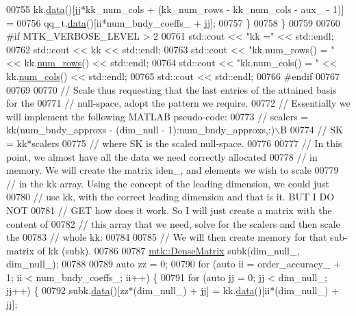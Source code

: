 \begin{DoxyCode}
{{00755       kk.\hyperlink{classmtk_1_1DenseMatrix_a0c33b8a9e01d157c61ddbdf807c25d84}{data}()[jj*kk\_num\_cols + (kk\_num\_rows - kk\_num\_cols - aux\_ - 1)] =
00756         qq\_t.\hyperlink{classmtk_1_1DenseMatrix_a0c33b8a9e01d157c61ddbdf807c25d84}{data}()[ii*num\_bndy\_coeffs\_ + jj];
00757     \}
00758   \}
00759 
00760 \textcolor{preprocessor}{  #if MTK\_VERBOSE\_LEVEL > 2}
00761   std::cout << \textcolor{stringliteral}{"kk ="} << std::endl;
00762   std::cout << kk << std::endl;
00763   std::cout << \textcolor{stringliteral}{"kk.num\_rows() = "} << kk.\hyperlink{classmtk_1_1DenseMatrix_a53f3afb3b6a8d21854458aaa9663cc74}{num\_rows}() << std::endl;
00764   std::cout << \textcolor{stringliteral}{"kk.num\_cols() = "} << kk.\hyperlink{classmtk_1_1DenseMatrix_a41747502d468c6728a4be31501b16e0e}{num\_cols}() << std::endl;
00765   std::cout << std::endl;
00766 \textcolor{preprocessor}{  #endif}
00767 
00769 
00770   \textcolor{comment}{// Scale thus requesting that the last entries of the attained basis for the}
00771   \textcolor{comment}{// null-space, adopt the pattern we require.}
00772   \textcolor{comment}{// Essentially we will implement the following MATLAB pseudo-code:}
00773   \textcolor{comment}{//  scalers = kk(num\_bndy\_approxs - (dim\_null - 1):num\_bndy\_approxs,:)\(\backslash\)B}
00774   \textcolor{comment}{//  SK = kk*scalers}
00775   \textcolor{comment}{// where SK is the scaled null-space.}
00776 
00777   \textcolor{comment}{// In this point, we almost have all the data we need correctly allocated}
00778   \textcolor{comment}{// in memory. We will create the matrix iden\_, and elements we wish to scale}
00779   \textcolor{comment}{// in the kk array. Using the concept of the leading dimension, we could just}
00780   \textcolor{comment}{// use kk, with the correct leading dimension and that is it. BUT I DO NOT}
00781   \textcolor{comment}{// GET how does it work. So I will just create a matrix with the content of}
00782   \textcolor{comment}{// this array that we need, solve for the scalers and then scale the}
00783   \textcolor{comment}{// whole kk:}
00784 
00785   \textcolor{comment}{// We will then create memory for that sub-matrix of kk (subk).}
00786 
00787   \hyperlink{classmtk_1_1DenseMatrix}{mtk::DenseMatrix} subk(dim\_null\_, dim\_null\_);
00788 
00789   \textcolor{keyword}{auto} zz = 0;
00790   \textcolor{keywordflow}{for} (\textcolor{keyword}{auto} ii = order\_accuracy\_ + 1; ii < num\_bndy\_coeffs\_; ii++) \{
00791     \textcolor{keywordflow}{for} (\textcolor{keyword}{auto} jj = 0; jj < dim\_null\_; jj++) \{
00792       subk.\hyperlink{classmtk_1_1DenseMatrix_a0c33b8a9e01d157c61ddbdf807c25d84}{data}()[zz*(dim\_null\_) + jj] = kk.\hyperlink{classmtk_1_1DenseMatrix_a0c33b8a9e01d157c61ddbdf807c25d84}{data}()[ii*(dim\_null\_) + jj];
}}
\end{DoxyCode}
